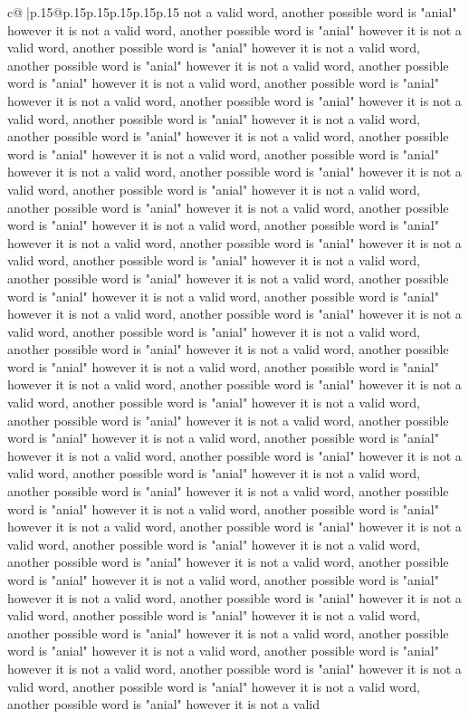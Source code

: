 \documentclass{article}
\begin{document}
{\begin{supertabular}{c@{$\;$}|p{.15\linewidth}@{}p{.15\linewidth}p{.15\linewidth}p{.15\linewidth}p{.15\linewidth}p{.15\linewidth}}
{{{not a valid word, another possible word is "anial" however it is not a valid word, another possible word is "anial" however it is not a valid word, another possible word is "anial" however it is not a valid word, another possible word is "anial" however it is not a valid word, another possible word is "anial" however it is not a valid word, another possible word is "anial" however it is not a valid word, another possible word is "anial" however it is not a valid word, another possible word is "anial" however it is not a valid word, another possible word is "anial" however it is not a valid word, another possible word is "anial" however it is not a valid word, another possible word is "anial" however it is not a valid word, another possible word is "anial" however it is not a valid word, another possible word is "anial" however it is not a valid word, another possible word is "anial" however it is not a valid word, another possible word is "anial" however it is not a valid word, another possible word is "anial" however it is not a valid word, another possible word is "anial" however it is not a valid word, another possible word is "anial" however it is not a valid word, another possible word is "anial" however it is not a valid word, another possible word is "anial" however it is not a valid word, another possible word is "anial" however it is not a valid word, another possible word is "anial" however it is not a valid word, another possible word is "anial" however it is not a valid word, another possible word is "anial" however it is not a valid word, another possible word is "anial" however it is not a valid word, another possible word is "anial" however it is not a valid word, another possible word is "anial" however it is not a valid word, another possible word is "anial" however it is not a valid word, another possible word is "anial" however it is not a valid word, another possible word is "anial" however it is not a valid word, another possible word is "anial" however it is not a valid word, another possible word is "anial" however it is not a valid word, another possible word is "anial" however it is not a valid word, another possible word is "anial" however it is not a valid word, another possible word is "anial" however it is not a valid word, another possible word is "anial" however it is not a valid word, another possible word is "anial" however it is not a valid word, another possible word is "anial" however it is not a valid word, another possible word is "anial" however it is not a valid word, another possible word is "anial" however it is not a valid word, another possible word is "anial" however it is not a valid word, another possible word is "anial" however it is not a valid word, another possible word is "anial" however it is not a valid word, another possible word is "anial" however it is not a valid word, another possible word is "anial" however it is not a valid word, another possible word is "anial" however it is not a valid word, another possible word is "anial" however it is not a valid word, another possible word is "anial" however it is not a valid word, another possible word is "anial" however it is not a valid }}}
\end{supertabular}}
\end{document}
